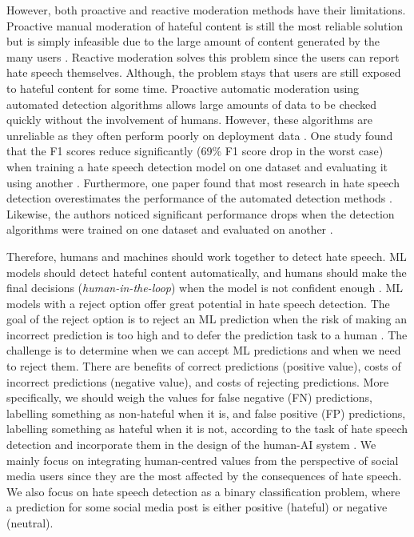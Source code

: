 %
However, both proactive and reactive moderation methods have their limitations.
%
Proactive manual moderation of hateful content is still the most reliable solution but is simply infeasible due to the large amount of content generated by the many users \citep{balayn2021automatic}.
%
Reactive moderation solves this problem since the users can report hate speech themselves.
%
Although, the problem stays that users are still exposed to hateful content for some time.
%
Proactive automatic moderation using automated detection algorithms allows large amounts of data to be checked quickly without the involvement of humans.
%
However, these algorithms are unreliable as they often perform poorly on deployment data \citep{balayn2021automatic, grondahl2018all, arango2019hate}.
%
One study found that the F1 scores reduce significantly (69\% F1 score drop in the worst case) when training a hate speech detection model on one dataset and evaluating it using another \citep{grondahl2018all}.
%
Furthermore, one paper found that most research in hate speech detection overestimates the performance of the automated detection methods \citep{arango2019hate}.
%
Likewise, the authors noticed significant performance drops when the detection algorithms were trained on one dataset and evaluated on another \citep{arango2019hate}.
%

%
Therefore, humans and machines should work together to detect hate speech.
%
ML models should detect hateful content automatically, and humans should make the final decisions (\textit{human-in-the-loop}) when the model is not confident enough \citep{woo2020future}.
%
ML models with a reject option offer great potential in hate speech detection.
%
The goal of the reject option is to reject an ML prediction when the risk of making an incorrect prediction is too high and to defer the prediction task to a human \citep{hendrickx2021machine}.
%
The challenge is to determine when we can accept ML predictions and when we need to reject them.
%
There are benefits of correct predictions (positive value), costs of incorrect predictions (negative value), and costs of rejecting predictions.
%
More specifically, we should weigh the values for false negative (FN) predictions, labelling something as non-hateful when it is, and false positive (FP) predictions, labelling something as hateful when it is not, according to the task of hate speech detection and incorporate them in the design of the human-AI system \citep{sayin2021science}.
%
We mainly focus on integrating human-centred values from the perspective of social media users since they are the most affected by the consequences of hate speech.
%
We also focus on hate speech detection as a binary classification problem, where a prediction for some social media post is either positive (hateful) or negative (neutral).
%

